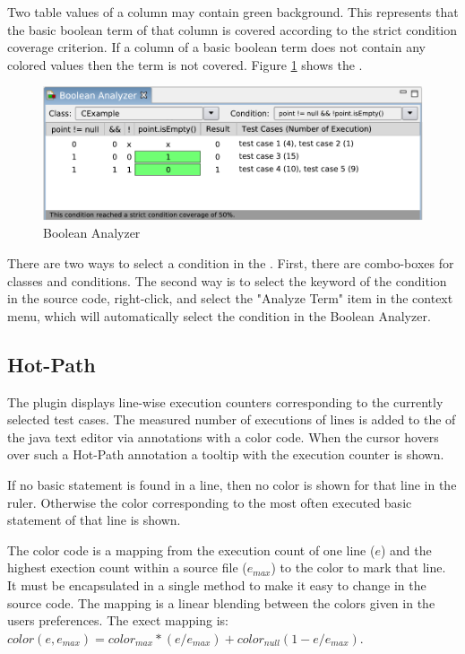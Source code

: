 Two table values of a column may contain green background. This represents that the basic boolean term of that column is covered according to the strict condition coverage criterion. If a column of a basic boolean term does not contain any colored values then the term is not covered. Figure \ref{ui_fg:Boolean Analyzer} shows the .

\begin{figure}[hbt]
 \centering
 \includegraphics[width=1.0\textwidth]{images/Boolean_Analyzer/Boolean_Analyzer}
 \caption{Boolean Analyzer}
 \label{ui_fg:Boolean Analyzer}
\end{figure}

There are two ways to select a condition in the . First, there are combo-boxes for classes and conditions. The second way is to select the keyword of the condition in the source code, right-click, and select the "Analyze Term" item in the context menu, which will automatically select the condition in the Boolean Analyzer.

\subsection{Hot-Path}\label{ui:Hot-Path}
The plugin displays line-wise execution counters corresponding to the currently selected test cases. The measured number of executions of lines is added to the  of the java text editor via annotations with a color code. When the cursor hovers over such a Hot-Path annotation a tooltip with the execution counter is shown.

If no basic statement is found in a line, then no color is shown for that line in the ruler. Otherwise the color corresponding to the most often executed basic statement of that line is shown.

The color code is a mapping from the execution count of one line ($e$) and the highest exection count within a source file ($e_{max}$) to the color to mark that line. It must be encapsulated in a single method to make it easy to change in the source code. The mapping is a linear blending between the colors given in the users preferences. The exect mapping is: $color(e, e_{max}) = color_{max} * (e/e_{max}) + color_{null}(1-e/e_{max})$.

